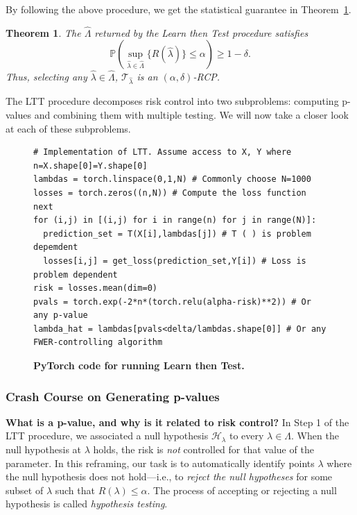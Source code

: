 \documentclass[10pt]{article}
\newtheorem{theorem}{Theorem}
\newcommand{\T}{\mathcal{T}}
\newcommand{\lhat}{\hat{\lambda}}
\newcommand{\Lhat}{\widehat{\Lambda}}
\newcommand{\Hlam}{\mathcal{H}_ {\lambda}}
\renewcommand{\P}{\mathbb{P}}
\begin{document}
By following the above procedure, we get the statistical guarantee in Theorem~\ref{thm:ltt}.
\begin{theorem}
    \label{thm:ltt}
    The $\Lhat$ returned by the Learn then Test procedure satisfies
    \begin{equation}
    \label{eq:fwer_control}
        \P \left(\sup_{\lhat\in \Lhat}\{R(\lhat)\} \le \alpha \right) \geq 1-\delta.
    \end{equation}
    Thus, selecting any $\lhat \in \Lhat$, $\T_{\hat{\lambda}}$ is an $(\alpha,\delta)$-RCP.
\end{theorem}

The LTT procedure decomposes risk control into two subproblems: computing p-values and combining them with multiple testing.
We will now take a closer look at each of these subproblems.

\begin{figure}
    \centering
    \begin{verbatim}
# Implementation of LTT. Assume access to X, Y where n=X.shape[0]=Y.shape[0]
lambdas = torch.linspace(0,1,N) # Commonly choose N=1000
losses = torch.zeros((n,N)) # Compute the loss function next
for (i,j) in [(i,j) for i in range(n) for j in range(N)]:
  prediction_set = T(X[i],lambdas[j]) # T ( ) is problem depemdent
  losses[i,j] = get_loss(prediction_set,Y[i]) # Loss is problem dependent
risk = losses.mean(dim=0)
pvals = torch.exp(-2*n*(torch.relu(alpha-risk)**2)) # Or any p-value
lambda_hat = lambdas[pvals<delta/lambdas.shape[0]] # Or any FWER-controlling algorithm 
    \end{verbatim}
    \caption{\textbf{PyTorch code for running Learn then Test.}}
    \label{fig:ltt-code}
\end{figure}
\subsubsection{Crash Course on Generating p-values}
\label{sec:p-values}
\textbf{What is a p-value, and why is it related to risk control?} In Step 1 of the LTT procedure, we associated a null hypothesis $\Hlam$ to every $\lambda \in \Lambda$.
When the null hypothesis at $\lambda$ holds, the risk is \emph{not} controlled for that value of the parameter.
In this reframing, our task is to automatically identify points $\lambda$ where the null hypothesis does not hold---i.e., to \emph{reject the null hypotheses} for some subset of $\lambda$ such that $R(\lambda) \leq \alpha$.
The process of accepting or rejecting a null hypothesis is called \emph{hypothesis testing}.
\end{document}
